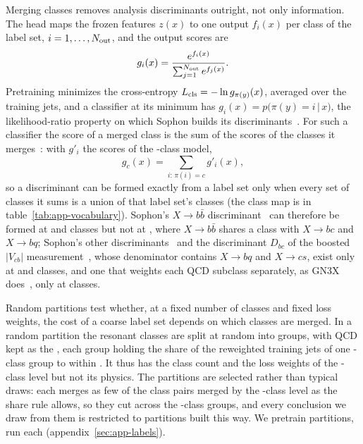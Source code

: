 Merging classes removes analysis discriminants outright, not only information. The head maps the frozen
features $z(x)$ to one output $f_i(x)$ per class of the label set, $i = 1,\dots,N_{\mathrm{out}}$, and the output scores are
\begin{equation}\label{eq:softmax}
  g_i(x) = \frac{e^{f_i(x)}}{\sum_{j=1}^{N_{\mathrm{out}}} e^{f_j(x)}} .
\end{equation}
Pretraining minimizes the cross-entropy $L_{\mathrm{cls}} = -\ln g_{\pi(y)}(x)$, averaged over the training jets, and a
classifier at its minimum has $g_i(x) = p\bigl(\pi(y) = i \,|\, x\bigr)$, the likelihood-ratio
property on which Sophon builds its discriminants~\cite[Eq.~(1)]{sophon}. For such a classifier the score of a
merged class is the sum of the scores of the classes it merges~\cite[Eq.~(2)]{sophon}: with $g'_i$ the scores
of the \Kfull-class model,
\begin{equation}\label{eq:division}
  g_c(x) = \sum_{i:\,\pi(i) = c} g'_i(x) ,
\end{equation}
so a discriminant can be formed exactly from a label set only when every set of classes it sums is a union of
that label set's classes (the class map is in table~\ref{tab:app-vocabulary}). Sophon's $X\to b\bar b$
discriminant~\cite[Eq.~(4)]{sophon} can therefore be formed at \Kfull{} and \Kres{} classes but not at \Kmid,
where $X\to b\bar b$ shares a class with $X\to bc$ and $X\to bq$; Sophon's other
discriminants~\cite[Eqs.~(5)--(9)]{sophon} and the discriminant $D_{bc}$ of the boosted $|V_{cb}|$
measurement~\cite[Eq.~(1)]{vcbboosted}, whose denominator contains $X\to bq$ and $X\to cs$, exist only at
\Kfull{} and \Kres{} classes, and one that weights each QCD subclass separately, as GN3X
does~\cite{atlasgnx}, only at \Kfull{} classes.

\label{sec:controls}%
Random partitions test whether, at a fixed number of classes and fixed loss weights, the cost of a coarse label
set depends on which classes are merged. In a random partition the \LitJetClassTwoNResonantClasses{} resonant
classes are split at random into \RandVtwoNResGroups{} groups, with QCD kept as the \RandVtwoQcdGroupOrd, each
group holding the share of the reweighted training jets of one \Kcoarse-class group to within
\RandVtwoShareTol. It thus has the class count and the loss weights of the
\Kcoarse-class level but not its physics. The partitions are selected rather than typical draws: each merges as
few of the class pairs merged by the \Kcoarse-class level as the share rule allows, so they cut across the
\Kcoarse-class groups, and every conclusion we draw from them is
restricted to partitions built this way. We pretrain \RandVtwoNPartitions{} partitions, \RandVtwoRuns{} run each
(appendix~\ref{sec:app-labels}).

